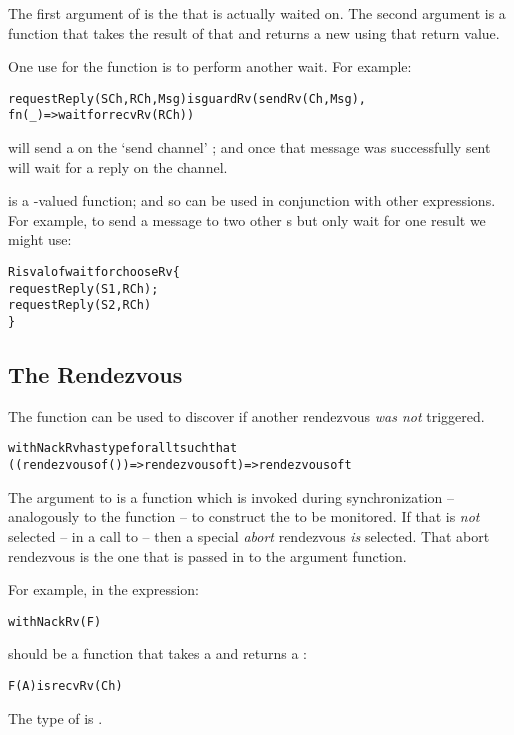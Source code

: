 The first argument of  is the  that is actually waited on. The second argument is a function that takes the result of that  and returns a new  using that return value.

One use for the  function is to perform another  wait. For example:
\begin{alltt}
requestReply(SCh,RCh,Msg) is guardRv(sendRv(Ch,Msg),
                                fn(_) => wait for recvRv(RCh))
\end{alltt}
will send a  on the `send channel' ; and once that message was successfully sent will wait for a reply on the  channel.

 is a -valued function; and so can be used in conjunction with other  expressions. For example, to send a message to two other s but only wait for one result we might use:
\begin{alltt}
R is valof wait for chooseRv\{
  requestReply(S1,RCh);
  requestReply(S2,RCh)
  \}
\end{alltt}

\subsection{The  Rendezvous}
\label{nackRvFun}
The  function can be used to discover if another rendezvous \emph{was not} triggered.
\begin{alltt}
withNackRv has type for all t such that 
                    ((rendezvous of ())=>rendezvous of t)=>rendezvous of t
\end{alltt}

The argument to  is a function which is invoked during synchronization -- analogously to the  function -- to construct the  to be monitored. If that  is \emph{not} selected -- in a call to  -- then a special \emph{abort} rendezvous \emph{is} selected. That abort rendezvous is the one that is passed in to the argument function.

For example, in the expression:
\begin{alltt}
withNackRv(F)
\end{alltt}
 should be a function that takes a  and returns a :
\begin{alltt}
F(A) is recvRv(Ch)
\end{alltt}
The type of  is .

